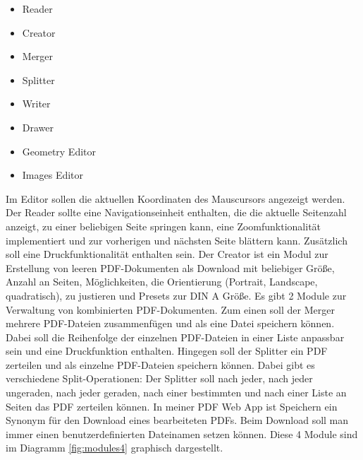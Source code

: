 \begin{itemize}
	\item Reader
	\item Creator
	\item Merger
	\item Splitter
	\item Writer
	\item Drawer
	\item Geometry Editor
	\item Images Editor
\end{itemize}

Im Editor sollen die aktuellen Koordinaten des Mauscursors angezeigt werden. Der Reader sollte eine Navigationseinheit enthalten, die die aktuelle Seitenzahl anzeigt, zu einer beliebigen Seite springen kann, eine Zoomfunktionalität implementiert und zur vorherigen und nächsten Seite blättern kann. Zusätzlich soll eine Druckfunktionalität enthalten sein. Der Creator ist ein Modul zur Erstellung von leeren PDF-Dokumenten als Download mit beliebiger Größe, Anzahl an Seiten, Möglichkeiten, die Orientierung (Portrait, Landscape, quadratisch), zu justieren und Presets zur DIN A Größe. Es gibt 2 Module zur Verwaltung von kombinierten PDF-Dokumenten. Zum einen soll der Merger mehrere PDF-Dateien zusammenfügen und als eine Datei speichern können. Dabei soll die Reihenfolge der einzelnen PDF-Dateien in einer Liste anpassbar sein und eine Druckfunktion enthalten. Hingegen soll der Splitter ein PDF zerteilen und als einzelne PDF-Dateien speichern können. Dabei gibt es verschiedene Split-Operationen: Der Splitter soll nach jeder, nach jeder ungeraden, nach jeder geraden, nach einer bestimmten und nach einer Liste an Seiten das PDF zerteilen können. In meiner PDF Web App ist Speichern ein Synonym für den Download eines bearbeiteten PDFs. Beim Download soll man immer einen benutzerdefinierten Dateinamen setzen können. Diese 4 Module sind im Diagramm \ref{fig:modules4} graphisch dargestellt. 

